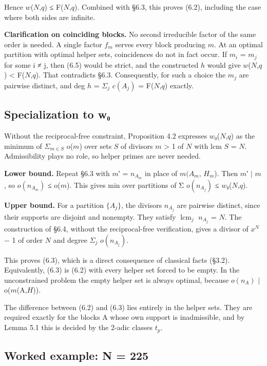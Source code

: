 \documentclass[pdflatex,sn-mathphys-num]{sn-jnl}
\theoremstyle{thmstyleone}
\theoremstyle{thmstylethree}
\begin{document}
Hence \(w\)(\(N\),\(q\)) ≤ F(\(N\),\(q\)). Combined with §6.3, this proves (6.2), including the case where both sides are infinite.

\textbf{Clarification on coinciding blocks.} No second irreducible factor of the same order is needed. A single factor \(f_m\) serves every block producing \(m\). At an optimal partition with optimal helper sets, coincidences do not in fact occur. If \(m_i\) = \(m_j\) for some i ≠ j, then (6.5) would be strict, and the constructed \(h\) would give \(w\)(\(N\),\(q\)) \textless{} F(\(N\),\(q\)). That contradicts §6.3. Consequently, for such a choice the \(m_j\) are pairwise distinct, and deg \(h\) = \(Σ_j\) \(c(A_j)\) = F(\(N\),\(q\)) exactly.

\subsection{Specialization to w₀}

Without the reciprocal-free constraint, Proposition 4.2 expresses \(w\)₀(\(N\),\(q\)) as the minimum of \(Σ_{m∈S}\) o(\(m\)) over sets \(S\) of divisors \(m\) \textgreater{} 1 of \(N\) with lcm \(S\) = \(N\). Admissibility plays no role, so helper primes are never needed.

\textbf{Lower bound.} Repeat §6.3 with \(m\)′ = \(n_{A_m}\) in place of \(m(A_m\), \(H_m\)). Then \(m\)′ \(\mid\) \(m\), so \(o(n_{A_m})\) ≤ o(\(m\)). This gives min over partitions of Σ \(o(n_{A_j})\) ≤ \(w\)₀(\(N\),\(q\)).

\textbf{Upper bound.} For a partition \(\{A_j\}\), the divisors \(n_{A_j}\) are pairwise distinct, since their supports are disjoint and nonempty. They satisfy \(\operatorname{lcm}_j\) \(n_{A_j}\) = \(N\). The construction of §6.4, without the reciprocal-free verification, gives a divisor of \(x^N\) − 1 of order \(N\) and degree \(Σ_j\) \(o(n_{A_j})\).

This proves (6.3), which is a direct consequence of classical facts (§3.2). Equivalently, (6.3) is (6.2) with every helper set forced to be empty. In the unconstrained problem the empty helper set is always optimal, because \(o(n_A)\) \(\mid\) o(\(m\)(A,\(H\))).

The difference between (6.2) and (6.3) lies entirely in the helper sets. They are required exactly for the blocks A whose own support is inadmissible, and by Lemma 5.1 this is decided by the 2-adic classes \(t_p\).

\subsection{Worked example: N = 225}
\end{document}
